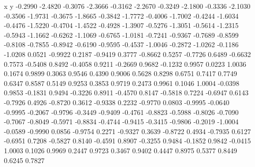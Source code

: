     x y    
    -0.2990   -2.4820
   -0.3076   -2.3666
   -0.3162   -2.2670
   -0.3249   -2.1800
   -0.3336   -2.1030
   -0.3506   -1.9731
   -0.3675   -1.8665
   -0.3842   -1.7772
   -0.4006   -1.7002
   -0.4244   -1.6034
   -0.4476   -1.5220
   -0.4704   -1.4522
   -0.4928   -1.3907
   -0.5276   -1.3051
   -0.5614   -1.2315
   -0.5943   -1.1662
   -0.6262   -1.1069
   -0.6765   -1.0181
   -0.7241   -0.9367
   -0.7689   -0.8599
   -0.8108   -0.7855
   -0.8942   -0.6190
   -0.9595   -0.4537
   -1.0046   -0.2872
   -1.0262   -0.1186
   -1.0208    0.0521
   -0.9922    0.2187
   -0.9419    0.3777
   -0.8662    0.5257
   -0.7726    0.6489
   -0.6632    0.7573
   -0.5408    0.8492
   -0.4058    0.9211
   -0.2669    0.9682
   -0.1232    0.9957
    0.0223    1.0036
    0.1674    0.9899
    0.3063    0.9546
    0.4390    0.9006
    0.5628    0.8298
    0.6751    0.7417
    0.7749    0.6347
    0.8587    0.5149
    0.9253    0.3853
    0.9719    0.2473
    0.9961    0.1046
    1.0004   -0.0398
    0.9853   -0.1831
    0.9494   -0.3226
    0.8911   -0.4570
    0.8147   -0.5818
    0.7224   -0.6947
    0.6143   -0.7926
    0.4926   -0.8720
    0.3612   -0.9338
    0.2232   -0.9770
    0.0803   -0.9995
   -0.0640   -0.9995
   -0.2067   -0.9796
   -0.3449   -0.9409
   -0.4761   -0.8823
   -0.5988   -0.8026
   -0.7090   -0.7067
   -0.8049   -0.5971
   -0.8834   -0.4744
   -0.9415   -0.3415
   -0.9806   -0.2019
   -1.0004   -0.0589
   -0.9990    0.0856
   -0.9754    0.2271
   -0.9327    0.3639
   -0.8722    0.4934
   -0.7935    0.6127
   -0.6951    0.7208
   -0.5827    0.8140
   -0.4591    0.8907
   -0.3255    0.9484
   -0.1852    0.9842
   -0.0415    1.0003
    0.1026    0.9969
    0.2447    0.9723
    0.3467    0.9402
    0.4447    0.8975
    0.5377    0.8449
    0.6245    0.7827